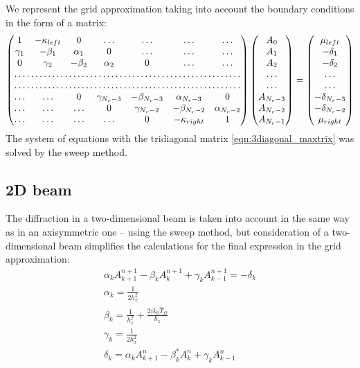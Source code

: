 \documentclass[a4paper, 12pt]{article}
\begin{document}
We represent the grid approximation taking into account the boundary conditions in the form of a matrix:
\begin{equation}
\label{eqn:3diagonal_maxtrix}
\begin{pmatrix}
1 & -\kappa_{left} & 0 & \dots & \dots & \dots & \dots\\
\gamma_1 & -\beta_1 & \alpha_1 & 0 & \dots & \dots & \dots\\
0 & \gamma_2 & -\beta_2 & \alpha_2 & 0 & \dots & \dots\\
\hdotsfor{7}\\
\hdotsfor{7}\\
\dots &\dots & 0 & \gamma_{N_r-3} & -\beta_{N_r-3} & \alpha_{N_r-3} & 0\\
\dots & \dots &\dots & 0 & \gamma_{N_r-2} & -\beta_{N_r-2} & \alpha_{N_r-2}\\
\dots &\dots &\dots &\dots & 0 & -\kappa_{right} & 1\\
\end{pmatrix}
\begin{pmatrix}
A_0 \\
A_1 \\
A_2 \\
\dots \\
\dots \\
A_{N_r-3} \\
A_{N_r-2} \\
A_{N_r-1}
\end{pmatrix}
=
\begin{pmatrix}
\mu_{left} \\
-\delta_1\\
-\delta_2\\
\dots \\
\dots \\
-\delta_{N_r-3}\\
-\delta_{N_r-2}\\
\mu_{right}
\end{pmatrix}
\end{equation}
The system of equations with the tridiagonal matrix \eqref{eqn:3diagonal_maxtrix} was solved by the sweep method.

\subsection{2D beam}

The diffraction in a two-dimensional beam is taken into account in the same way as in an axisymmetric one -- using the sweep method, but consideration of a two-dimensional beam simplifies the calculations for the final expression in the grid approximation:
\begin{gather}
\alpha_kA_{k+1}^{n+1} - \beta_k A_{k}^{n+1} + \gamma_k A_{k-1}^{n+1} = -\delta_k\\
\alpha_k = \frac1{2h_x^2}\\
\beta_k = \frac1{h_x^2} + \frac{2 i k_0 \hat{T}_\Omega}{h_z}\\
\gamma_k = \frac1{2h_x^2}\\
\delta_k = \alpha_kA_{k+1}^{n} - \beta^{*}_k A_{k}^{n} + \gamma_k A_{k-1}^{n}
\end{gather}
\end{document}

